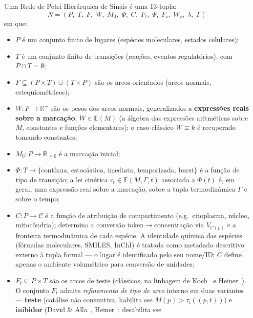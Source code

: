 \begin{definition}
\label{def:shpn}
Uma Rede de Petri Hierárquica de Sinais é uma 13-tupla:
\[
N = (P,\; T,\; F,\; W,\; M_0,\; \Phi,\; C,\; F_t,\; \Psi,\; F_s,\; W_s,\; \lambda,\; \Gamma)
\]
em que:
\begin{itemize}
  \item $P$ é um conjunto finito de lugares (espécies moleculares, estados
        celulares);
  \item $T$ é um conjunto finito de transições (reações, eventos regulatórios),
        com $P \cap T = \emptyset$;
  \item $F \subseteq (P \times T) \cup (T \times P)$ são os arcos orientados
        (arcos normais, estequiométricos);
  \item $W: F \to \mathbb{R}^+$ são os pesos dos arcos normais, generalizados
        a \textbf{expressões reais sobre a marcação}, $W \in \mathbb{E}(M)$
        (a álgebra das expressões aritméticas sobre $M$, constantes e funções
        elementares); o caso clássico $W \equiv k$ é recuperado tomando
        constantes;
  \item $M_0: P \to \mathbb{R}_{\geq 0}$ é a marcação inicial;
  \item $\Phi: T \to \{\text{contínua, estocástica, imediata, temporizada,
        burst}\}$ é a função de tipo de transição; a lei cinética
        $r_t \in \mathbb{E}(M, \Gamma, t)$ associada a $\Phi(t)$ é, em
        geral, uma expressão real sobre a marcação, sobre a tupla
        termodinâmica $\Gamma$ e sobre o tempo;
  \item $C: P \to \mathcal{C}$ é a função de atribuição de compartimento
        (e.g.\ citoplasma, núcleo, mitocôndria); determina a conversão
        token$\to$concentração via $V_{C(p)}$ e a fronteira termodinâmica
        de cada espécie. A identidade química das espécies (fórmulas
        moleculares, SMILES, InChI) é tratada como metadado descritivo
        externo à tupla formal — o lugar é identificado pelo seu nome/ID;
        $C$ define apenas o ambiente volumétrico para conversão de unidades;
  \item $F_t \subseteq P \times T$ são os arcos de teste (clássicos, na
        linhagem de Koch~\cite{Koch2011} e Heiner~\cite{Heiner2008}). O
        conjunto $F_t$ admite \emph{refinamento de tipo de arco} interno em
        duas variantes — \textbf{teste} (catálise não consuntiva, habilita
        sse $M(p) > \tau_t((p,t))$) e \textbf{inibidor} (David \&
        Alla~\cite{David1992}, Heiner~\cite{Heiner2008}; desabilita sse

\end{itemize}
\end{definition}
